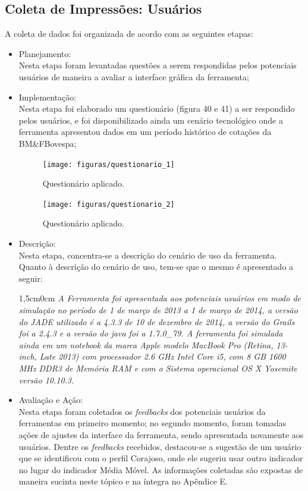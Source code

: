 \subsection{Coleta de Impressões: Usuários}


A coleta de dados foi organizada de acordo com as seguintes etapas: 
\begin{itemize}
\item Planejamento:\\
Nesta etapa foram levantadas questões a serem respondidas pelos potenciais usuários de maneira a avaliar a interface gráfica da ferramenta;

\item Implementação:\\
Nesta etapa foi elaborado um questionário (figura 40 e 41) a ser respondido pelos usuários, e foi disponibilizado ainda um cenário tecnológico onde a ferramenta apresentou dados em um período histórico de cotações da BM\&FBovespa;

\begin{figure}[h!]
\centering
\label{f34}
\texttt{[image: figuras/questionario\_1]}
\caption{Questionário aplicado.}
\end{figure}

\begin{figure}[h!]
\centering
\label{f34}
\texttt{[image: figuras/questionario\_2]}
\caption{Questionário aplicado.}
\end{figure}
\FloatBarrier

\item Descrição:\\
Nesta etapa, concentra-se a descrição do cenário de uso da ferramenta. Quanto à descrição do cenário de uso, tem-se que o mesmo é apresentado a seguir:

\begin{adjustwidth}{1,5cm}{0cm}
 \textit{A Ferramenta foi apresentada aos potenciais usuários em modo de simulação no período de 1 de março de 2013 a 1 de março de 2014, a versão do JADE utilizado é a 4.3.3 de 10 de dezembro de 2014, a versão do Grails foi a 2.4.3 e a versão do java foi a 1.7.0\_79. A ferramenta foi simulada ainda em um notebook da marca Apple modelo MacBook Pro (Retina, 13-inch, Late 2013) com processador 2.6 GHz Intel Core i5, com 8 GB 1600 MHz DDR3 de Memória RAM e com o Sistema operacional OS X Yosemite versão 10.10.3.} 
\end{adjustwidth}

\item Avaliação e Ação:\\
Nesta etapa foram coletados os \textit{feedbacks} dos potenciais usuários da ferramentas em primeiro momento; no segundo momento, foram tomadas ações de ajustes da interface da ferramenta, sendo apresentada novamente aos usuários. Dentre os \textit{feedbacks} recebidos, destacou-se a sugestão de um usuário que se identificou com o perfil Corajoso, onde ele sugeriu usar outro indicador no lugar do indicador Média Móvel. As informações coletadas são expostas de maneira sucinta neste tópico e na íntegra no Apêndice E.
\end{itemize}
